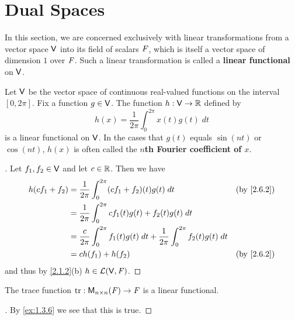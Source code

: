 \section{Dual Spaces}\label{sec:2.6}

\begin{defn}\label{2.6.1}
	In this section, we are concerned exclusively with linear transformations from a vector space \(\mathsf{V}\) into its field of scalars \(\mathit{F}\), which is itself a vector space of dimension \(1\) over \(\mathit{F}\).
	Such a linear transformation is called a \textbf{linear functional} on \(\mathsf{V}\).
\end{defn}

\begin{eg}\label{2.6.2}
	Let \(\mathsf{V}\) be the vector space of continuous real-valued functions on the interval \([0, 2 \pi]\).
	Fix a function \(g \in \mathsf{V}\).
	The function \(h : \mathsf{V} \to \mathbb{R}\) defined by
	\[
		h(x) = \frac{1}{2 \pi} \int_{0}^{2 \pi} x(t) g(t) \; dt
	\]
	is a linear functional on \(\mathsf{V}\).
	In the cases that \(g(t)\) equals \(\sin(nt)\) or \(\cos(nt)\), \(h(x)\) is often called the \textbf{\(n\)th Fourier coefficient of \(x\)}.
\end{eg}

\begin{proof}[]
	Let \(f_1, f_2 \in \mathsf{V}\) and let \(c \in \mathbb{R}\).
	Then we have
	\begin{align*}
		h(cf_1 + f_2) & = \frac{1}{2 \pi} \int_{0}^{2 \pi} (cf_1 + f_2)(t) g(t) \; dt                                             &  & \by{2.6.2} \\
		              & = \frac{1}{2 \pi} \int_{0}^{2 \pi} cf_1(t) g(t) + f_2(t) g(t) \; dt                                                       \\
		              & = \frac{c}{2 \pi} \int_{0}^{2 \pi} f_1(t) g(t) \; dt + \frac{1}{2 \pi} \int_{0}^{2 \pi} f_2(t) g(t) \; dt                 \\
		              & = c h(f_1) + h(f_2)                                                                                       &  & \by{2.6.2}
	\end{align*}
	and thus by \cref{2.1.2}(b) \(h \in \mathcal{L}(\mathsf{V}, \mathit{F})\).
\end{proof}

\begin{eg}\label{2.6.3}
	The trace function \(\tr : \ms[n][n][\F] \to \F\) is a linear functional.
\end{eg}

\begin{proof}[]
	By \cref{ex:1.3.6} we see that this is true.
\end{proof}

